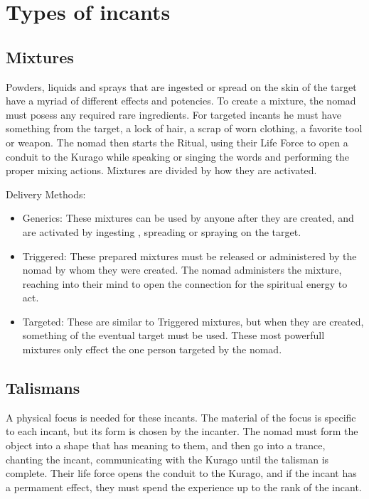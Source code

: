 \section{Types of incants}

\subsection{Mixtures}

Powders, liquids and sprays that are ingested or spread on the skin of the target have a myriad of different effects and potencies.  To create a mixture, the nomad must posess any required rare ingredients. For targeted incants he must have something from the target, a lock of hair, a scrap of worn clothing, a favorite tool or weapon. The nomad then starts the Ritual, using their Life Force to open a conduit to the Kurago while speaking or singing the words and performing the proper mixing actions. Mixtures are divided by how they are activated.

Delivery Methods:
\begin{itemize}
\item Generics: These mixtures can be used by anyone after they are created, and are activated by ingesting , spreading or spraying on the target.

\item Triggered: These prepared mixtures must be released or administered by the nomad by whom they were created. The nomad administers the mixture, reaching into their mind to open the connection for the spiritual energy to act.

\item Targeted: These are similar to Triggered mixtures, but when they are created, something of the eventual target must be used. These most powerfull mixtures only effect the one person targeted by the nomad.
\end{itemize}

\subsection{Talismans}

A physical focus is needed for these incants. The material of the focus is specific to each incant, but its form is chosen by the incanter. The nomad must form the object into a shape that has meaning to them, and then go into a trance, chanting the incant, communicating with the Kurago until the talisman is complete. Their life force opens the conduit to the Kurago, and if the incant has a permament effect, they must spend the experience up to the rank of the incant.

